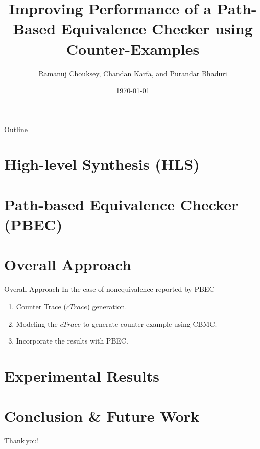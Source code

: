 \documentclass[presentation]{beamer}
\title[VLSID 2019]{Improving Performance of a Path-Based
Equivalence Checker using Counter-Examples}
\author[{R. Chouksey et al.}]{\rmfamily Ramanuj Chouksey, Chandan Karfa, and Purandar Bhaduri}
\institute[IIT Guwahati]{Indian Institute of Technology Guwahati}
\date[\tiny\today]{\tiny\today}
\begin{document}
\begin{frame}
\titlepage
\end{frame}

\begin{frame}{Outline}
\tableofcontents
\end{frame}

\section{High-level Synthesis (HLS)}

\section{Path-based Equivalence Checker (PBEC)}

\section{Overall Approach}
\begin{frame}{Overall Approach}
In the case of nonequivalence reported by PBEC
\begin{enumerate}
\item Counter Trace ({\color{blue}$\mathit{cTrace}$}) {\color{blue}generation}. 
\item {\color{blue}Modeling} the $\mathit{cTrace}$ to generate counter example using {\color{blue}CBMC}.
\item {\color{blue}Incorporate} the results with PBEC.
\end{enumerate}
\end{frame}



\section{Experimental Results}

\section{Conclusion \& Future Work}

\begin{frame}{}
\centering
{\calligra\fontsize{40}{60}\selectfont Thank\,you!}
\end{frame}
\end{document}
